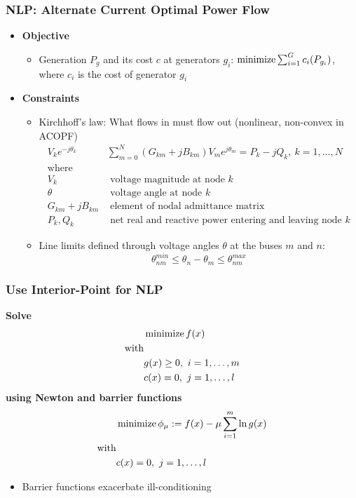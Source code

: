 \begin{frame}[fragile]
  \frametitle{NLP: Alternate Current Optimal Power Flow}
  \begin{itemize}
    \item {\bf Objective}
    \begin{itemize}
      \item Generation $P_g$ and its cost $c$ at generators $g_i$:
      $ \minimize \sum^G_{i=1} c_i(P_{g_i})$, where $c_i$ is the cost of generator $g_i$
    \end{itemize}
    \item {\bf Constraints}
    \begin{itemize}
      \item Kirchhoff's law: What flows in must flow out (nonlinear, non-convex in ACOPF)
      \begin{align*}
        V_k e^{-j\theta_k} & \sum^{N}_{m=0} (G_{km} + jB_{km})V_m e^{j\theta_m} = P_k - j Q_k,\ k = 1, \dots, N \\
        \text{where}\\
        V_k &\text{ voltage magnitude at node } k\\
        \theta &\text{ voltage angle at node } k\\
        G_{km} + jB_{km}& \text{ element of nodal admittance matrix}\\
        P_k , Q_k &\text{ net real and reactive power entering and leaving node } k
      \end{align*}
      \item Line limits defined through voltage angles $\theta$ at the buses $m$ and $n$:
      $$ \theta^{min}_{nm} \leq \theta_n - \theta_m \leq \theta^{max}_{nm}$$
    \end{itemize}
  \end{itemize}
\end{frame}

\begin{frame}[fragile]
  \frametitle{Use Interior-Point for NLP}
  {\bf Solve}
  \begin{align*}
  &\minimize f(x)\\ 
  \text{with}&\\
  &g(x) \geq 0, \ i=1,\dots, m \\
  &c(x) = 0, \ j=1,\dots, l \\
  \end{align*}
  {\bf using Newton and barrier functions}
  \begin{align*}
  &\minimize \phi_\mu := f(x) - \mu \sum^m_{i=1} \ln g(x)\\ 
  \text{with}&\\
  &c(x) = 0, \ j=1,\dots, l 
  \end{align*}
  \begin{itemize}
    \item Barrier functions exacerbate ill-conditioning
  \end{itemize}
\end{frame}

